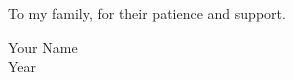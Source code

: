 \begin{dedication}
To my family, for their patience and support.

\bigskip
Your Name\\
Year
\end{dedication}

